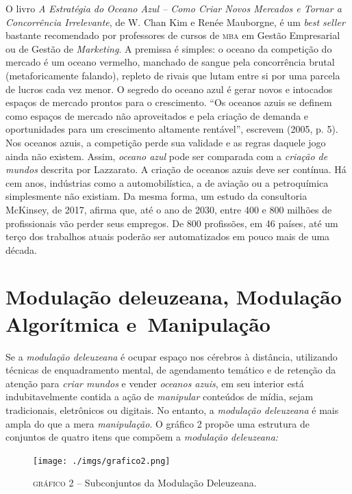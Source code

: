 O livro \emph{A Estratégia do Oceano Azul -- Como Criar Novos Mercados e
Tornar a Concorrência Irrelevante}, de W. Chan Kim e Renée Mauborgne, é
um \emph{best seller} bastante recomendado por professores de cursos de
\textsc{mba} em Gestão Empresarial ou de Gestão de \emph{Marketing}. A premissa é
simples: o oceano da competição do mercado é um oceano vermelho,
manchado de sangue pela concorrência brutal (metaforicamente falando),
repleto de rivais que lutam entre si por uma parcela de lucros cada vez
menor. O segredo do oceano azul é gerar novos e intocados espaços de
mercado prontos para o crescimento. ``Os oceanos azuis se definem como
espaços de mercado não aproveitados e pela criação de demanda e
oportunidades para um crescimento altamente rentável'', escrevem (2005,
p. 5). Nos oceanos azuis, a competição perde sua validade e as regras
daquele jogo ainda não existem. Assim, \emph{oceano azul} pode ser
comparada com a \emph{criação de mundos} descrita por Lazzarato. A
criação de oceanos azuis deve ser contínua. Há cem anos, indústrias como
a automobilística, a de aviação ou a petroquímica simplesmente não
existiam. Da mesma forma, um estudo da consultoria McKinsey, de 2017,
afirma que, até o ano de 2030, entre 400 e 800 milhões de profissionais
vão perder seus empregos. De 800 profissões, em 46 países, até um terço
dos trabalhos atuais poderão ser automatizados em pouco mais de uma
década.

\section{Modulação deleuzeana, Modulação Algorítmica e~Manipulação}

\noindent{}Se a \emph{modulação deleuzeana} é ocupar espaço nos cérebros à
distância, utilizando técnicas de enquadramento mental, de agendamento
temático e de retenção da atenção para \emph{criar mundos} e vender
\emph{oceanos azuis}, em seu interior está indubitavelmente contida a
ação de \emph{manipular} conteúdos de mídia, sejam tradicionais,
eletrônicos ou digitais. No entanto, a \emph{modulação deleuzeana} é
mais ampla do que a mera \emph{manipulação}. O gráfico 2 propõe uma
estrutura de conjuntos de quatro itens que compõem a \emph{modulação
deleuzeana:}



\begin{figure}[!ht]
\texttt{[image: ./imgs/grafico2.png]}
\caption{\textsc{gráfico} 2 -- Subconjuntos da Modulação Deleuzeana.}
\end{figure}

